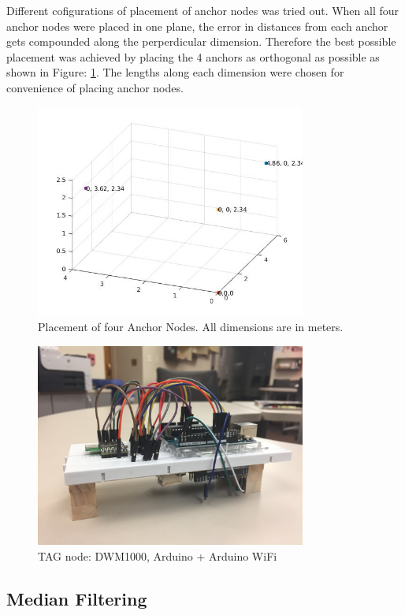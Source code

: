\documentclass[journal,transmag]{IEEEtran}
\begin{document}
Different cofigurations of placement of anchor nodes was tried out. When all four anchor nodes were placed in one plane, the error in distances from each anchor gets compounded along the perperdicular dimension. Therefore the best possible placement was achieved by placing the 4 anchors as orthogonal as possible as shown in Figure: \ref{anchorplacement}. The lengths along each dimension were chosen for convenience of placing anchor nodes.

\begin{figure}[!h]
\centering
\includegraphics[width=3.5in]{anchorplacements3d.jpg}
\caption{{Placement of four Anchor Nodes. All dimensions are in meters.}}
\label{anchorplacement}
\end{figure}


\begin{figure}[!h]
\centering
\includegraphics[width=3.5in]{tagnode.JPG}
\caption{{TAG node: DWM1000, Arduino + Arduino WiFi}}
\label{fig:tagnode}
\end{figure}

\subsection{Median Filtering}
\end{document}
